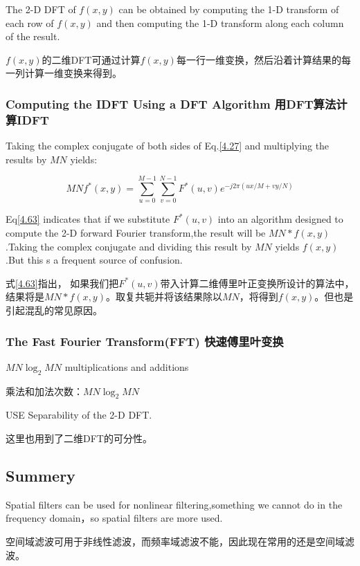 \documentclass[12pt]{article}
\numberwithin{equation}{section}%
\begin{document}
The 2-D DFT of $f(x,y)$ can be obtained by computing the 1-D transform of each row of $f(x,y)$ and then computing the 1-D transform along each column of the result.

  
$f(x,y)$的二维DFT可通过计算$f(x,y)$每一行一维变换，然后沿着计算结果的每一列计算一维变换来得到。

\subsubsection{Computing the IDFT Using a DFT Algorithm 用DFT算法计算IDFT}

Taking the complex conjugate of both sides of Eq.\ref{4.27} and multiplying the results by $MN$ yields:

\begin{equation} \label{4.63}
MNf^{*}(x,y)=\sum_{u=0}^{M-1}\sum_{v=0}^{N-1}F^{*}(u,v)e^{-j2\pi(ux/M+vy/N)}
\end{equation}
 
Eq\ref{4.63} indicates that if we substitute $F^{*}(u,v)$ into an algorithm designed to compute the 2-D forward Fourier transform,the result will be $MN*f(x,y)$ .Taking the complex conjugate and dividing this result by $MN$ yields $f(x,y)$.But this s a frequent source of confusion.

 
式\ref{4.63}指出， 如果我们把$F^{*}(u,v)$带入计算二维傅里叶正变换所设计的算法中，结果将是$MN*f(x,y)$。取复共轭并将该结果除以$MN$，将得到$f(x,y)$。但也是引起混乱的常见原因。



\subsubsection{The Fast Fourier Transform(FFT) 快速傅里叶变换}

$MN\log _{2}MN$ multiplications and additions

乘法和加法次数：$MN\log _{2}MN$ 

USE Separability of the 2-D DFT.

这里也用到了二维DFT的可分性。

\subsection{Summery}%

Spatial filters can be used for nonlinear filtering,something we cannot do in the frequency domain，so spatial filters are more used.

空间域滤波可用于非线性滤波，而频率域滤波不能，因此现在常用的还是空间域滤波。
\end{document}
